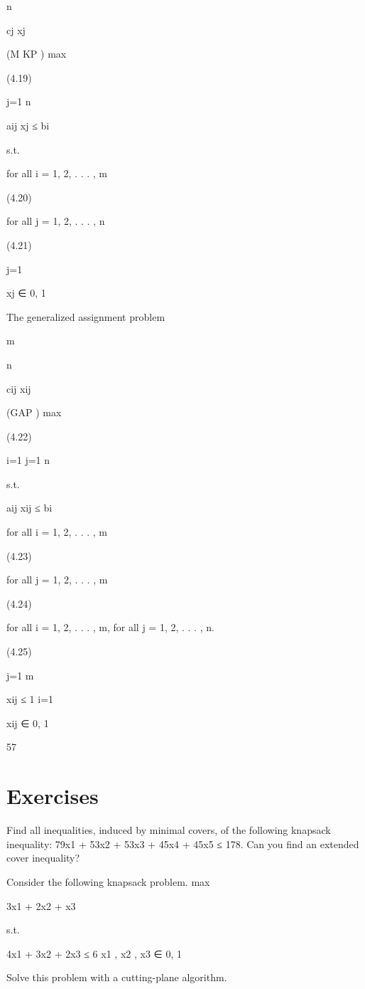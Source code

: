 n

cj xj

(M KP ) max

(4.19)

j=1
n

aij xj ≤ bi

s.t.

for all i = 1, 2, . . . , m

(4.20)

for all j = 1, 2, . . . , n

(4.21)

j=1

xj ∈ {0, 1}

The generalized assignment problem

m

n

cij xij

(GAP ) max

(4.22)

i=1 j=1
n

s.t.

aij xij ≤ bi

for all i = 1, 2, . . . , m

(4.23)

for all j = 1, 2, . . . , m

(4.24)

for all i = 1, 2, . . . , m, for all j = 1, 2, . . . , n.

(4.25)

j=1
m

xij ≤ 1
i=1

xij ∈ {0, 1}

57

\section*{Exercises}
\begin{exercise}
Find all inequalities, induced by minimal covers, of the following knapsack inequality:
79x1 + 53x2 + 53x3 + 45x4 + 45x5 ≤ 178.
Can you find an extended cover inequality?
\end{exercise}

\begin{exercise}
Consider the following knapsack problem.
max

3x1 + 2x2 + x3

s.t.

4x1 + 3x2 + 2x3 ≤ 6
x1 , x2 , x3 ∈ {0, 1}

Solve this problem with a cutting-plane algorithm.
\end{exercise}

